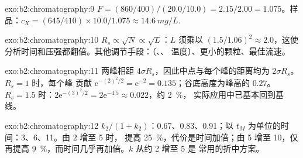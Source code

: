 \begin{solution}{exo:b2:chromatography:9}
$F = (860/400)/(20.0/10.0) = 2.15/2.00 = 1.075$。样品：$c_X = (645/410) \times 10.0/1.075 \approx
\qty{14.6}{mg/L}$.
\end{solution}

\begin{solution}{exo:b2:chromatography:10}
$R_s \propto \sqrt N \propto \sqrt L$：$L$ 须乘以 $(1.5/1.06)^2 \approx 2.0$，这使
分析时间和压强都翻倍。其他调节手段：（、、
温度）、更小的颗粒、最佳流速。
\end{solution}

\begin{solution}{exo:b2:chromatography:11}
两峰相距 $4\sigma R_s$，因此中点与每个峰的距离均为 $2\sigma R_s$。$R_s = 1$ 时，每个峰
贡献 $\mathrm e^{-(2)^2/2} = \mathrm e^{-2} = 0.135$；谷底高度为峰高的 $0.27$。
$R_s = 1.5$ 时：$2\mathrm e^{-(3)^2/2} = 2\mathrm e^{-4.5} \approx 0.022$，约 2~\%，
实际应用中已基本回到基线。
\end{solution}

\begin{solution}{exo:b2:chromatography:12}
$k_2/(1+k_2)$：0.67、0.83、0.91；以 $t_M$ 为单位的时间：3、6、11。由 2 增至 5 时，
提高 25~\%，代价是时间加倍；由 5 增至 10，仅再提高 9~\%，而时间几乎再加倍。$k$ 从约 2 增至 5 是
常用的折中方案。
\end{solution}

